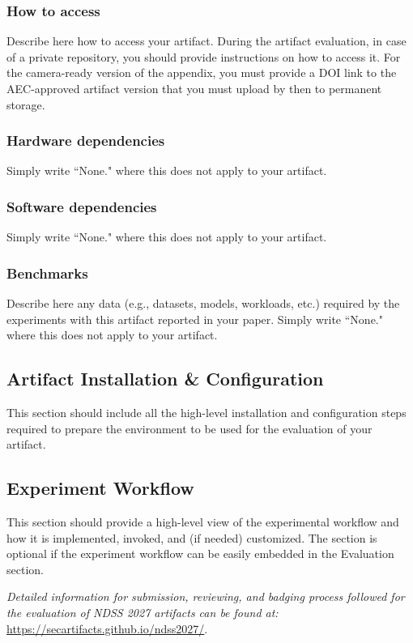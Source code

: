 \documentclass[conference]{IEEEtran}
\begin{document}
\subsubsection{How to access}
Describe here how to access your artifact. During the artifact evaluation, in case of a private repository, you should provide instructions on how to access it. For the camera-ready version of the appendix, you must provide a DOI link to the AEC-approved artifact version that you must upload by then to permanent storage.

\subsubsection{Hardware dependencies}
Simply write ``None." where this does not apply to your artifact.

\subsubsection{Software dependencies}
Simply write ``None." where this does not apply to your artifact.

\subsubsection{Benchmarks}
Describe here any data (e.g., datasets, models, workloads, etc.) required by the experiments with this artifact reported in your paper. Simply write ``None." where this does not apply to your artifact.


\subsection{Artifact Installation \& Configuration}

This section should include all the high-level installation and configuration steps required to prepare the environment to be used for the evaluation of your artifact.

\subsection{Experiment Workflow}

This section should provide a high-level view of the experimental workflow and how it is implemented, invoked, and (if needed) customized. The section is optional if the experiment workflow can be easily embedded in the Evaluation section.

\textit{Detailed information for submission, reviewing, and badging process followed for the evaluation of NDSS 2027 artifacts can be found at:} \url{https://secartifacts.github.io/ndss2027/}.
\end{document}
